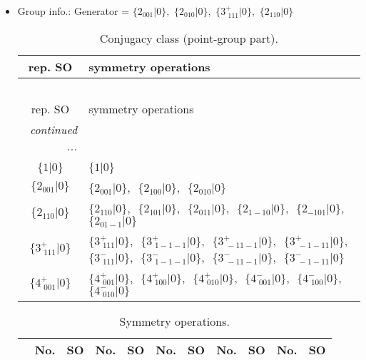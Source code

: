 \documentclass[fleqn,10pt,landscape]{article}
\begin{document}
\begin{itemize}
\item Group info.: Generator = $\{2{}_{001}|0\},\,\,\{2{}_{010}|0\},\,\,\{3^{+}_{\,\,111}|0\},\,\,\{2{}_{110}|0\}$

\begin{center}
\renewcommand{\arraystretch}{1.3}
\begin{longtable}{c|l}
\caption{Conjugacy class (point-group part).}
 \\
 \hline \hline
rep. SO & symmetry operations \\ \hline \endfirsthead

\multicolumn{1}{l}{\tablename\ \thetable{}} \\
 \hline \hline
rep. SO & symmetry operations \\ \hline \endhead

 \hline \hline
\multicolumn{1}{r}{\footnotesize\it continued ...} \\ \endfoot

 \hline \hline
\multicolumn{1}{r}{} \\ \endlastfoot

$\{1|0\}$ & $\{1|0\}$ \\ \hline
$\{2{}_{001}|0\}$ & $\{2{}_{001}|0\}$,\,\, $\{2{}_{100}|0\}$,\,\, $\{2{}_{010}|0\}$ \\ \hline
$\{2{}_{110}|0\}$ & $\{2{}_{110}|0\}$,\,\, $\{2{}_{101}|0\}$,\,\, $\{2{}_{011}|0\}$,\,\, $\{2{}_{1-10}|0\}$,\,\, $\{2{}_{-101}|0\}$,\,\, $\{2{}_{01-1}|0\}$ \\ \hline
$\{3^{+}_{\,\,111}|0\}$ & $\{3^{+}_{\,\,111}|0\}$,\,\, $\{3^{+}_{\,\,1-1-1}|0\}$,\,\, $\{3^{+}_{\,\,-11-1}|0\}$,\,\, $\{3^{+}_{\,\,-1-11}|0\}$,\,\, $\{3^{-}_{\,\,111}|0\}$,\,\, $\{3^{-}_{\,\,1-1-1}|0\}$,\,\, $\{3^{-}_{\,\,-11-1}|0\}$,\,\, $\{3^{-}_{\,\,-1-11}|0\}$ \\ \hline
$\{4^{+}_{\,\,001}|0\}$ & $\{4^{+}_{\,\,001}|0\}$,\,\, $\{4^{+}_{\,\,100}|0\}$,\,\, $\{4^{+}_{\,\,010}|0\}$,\,\, $\{4^{-}_{\,\,001}|0\}$,\,\, $\{4^{-}_{\,\,100}|0\}$,\,\, $\{4^{-}_{\,\,010}|0\}$ \\
\end{longtable}
\end{center}
\begin{center}
\renewcommand{\arraystretch}{1.3}
\begin{longtable}{c|cc|cc|cc|cc|cc}
\caption{Symmetry operations.}
 \\
 \hline \hline
 & No. & SO & No. & SO & No. & SO & No. & SO & No. & SO \\ \hline \endfirsthead


\end{longtable}
\end{center}
\end{itemize}
\end{document}
